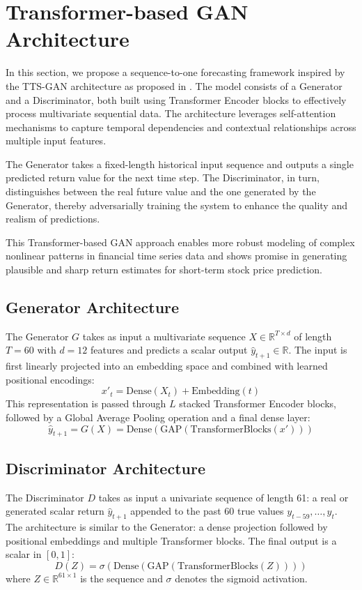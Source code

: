 \section{Transformer-based GAN Architecture}

In this section, we propose a sequence-to-one forecasting framework inspired by the TTS-GAN architecture as proposed in \cite{yoon_time-series_2019}. The model consists of a Generator and a Discriminator, both built using Transformer Encoder blocks to effectively process multivariate sequential data. The architecture leverages self-attention mechanisms to capture temporal dependencies and contextual relationships across multiple input features.

The Generator takes a fixed-length historical input sequence and outputs a single predicted return value for the next time step. The Discriminator, in turn, distinguishes between the real future value and the one generated by the Generator, thereby adversarially training the system to enhance the quality and realism of predictions.

This Transformer-based GAN approach enables more robust modeling of complex nonlinear patterns in financial time series data and shows promise in generating plausible and sharp return estimates for short-term stock price prediction.

\subsection{Generator Architecture}

The Generator $G$ takes as input a multivariate sequence $X \in \mathbb{R}^{T \times d}$ of length $T=60$ with $d=12$ features and predicts a scalar output $\hat{y}_{t+1} \in \mathbb{R}$. The input is first linearly projected into an embedding space and combined with learned positional encodings:
\[
x'_t = \text{Dense}(X_t) + \text{Embedding}(t)
\]
This representation is passed through $L$ stacked Transformer Encoder blocks, followed by a Global Average Pooling operation and a final dense layer:
\[
\hat{y}_{t+1} = G(X) = \text{Dense}(\text{GAP}(\text{TransformerBlocks}(x')))
\]

\subsection{Discriminator Architecture}

The Discriminator $D$ takes as input a univariate sequence of length 61: a real or generated scalar return $\hat{y}_{t+1}$ appended to the past 60 true values $y_{t-59}, \dots, y_t$. The architecture is similar to the Generator: a dense projection followed by positional embeddings and multiple Transformer blocks. The final output is a scalar in $[0, 1]$:
\[
D(Z) = \sigma(\text{Dense}(\text{GAP}(\text{TransformerBlocks}(Z))))
\]
where $Z \in \mathbb{R}^{61 \times 1}$ is the sequence and $\sigma$ denotes the sigmoid activation.

